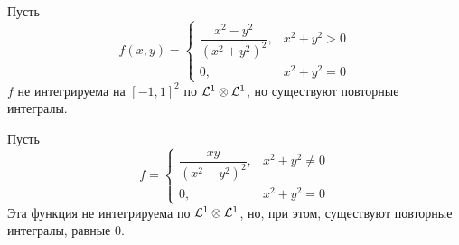 \begin{example}
    Пусть \[f(x, y) = \begin{cases}
        \dfrac{x^2 - y^2}{(x^2 + y^2)^2}, & x^2 + y^2 > 0 \\
        0, & x^2 + y^2 = 0 
    \end{cases}\]
    $f$ не интегрируема на $[-1, 1]^2$ по $\mathcal{L}^1 \otimes \mathcal{L}^1$, но существуют повторные интегралы.
\end{example}
\begin{example}
    Пусть \[f = \begin{cases}
        \dfrac{xy}{(x^2 + y^2)^2}, & x^2 + y^2 \neq 0 \\
        0, & x^2 + y^2 = 0
    \end{cases}\]
    Эта функция не интегрируема по $\mathcal{L}^1 \otimes \mathcal{L}^1$, но, при этом,  существуют повторные интегралы, равные $0$.
\end{example}

